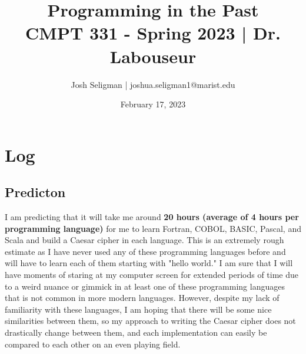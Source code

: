 \documentclass[letterpaper, 10pt, DIV=13]{scrartcl}
\title {
	\normalfont
	\huge{Programming in the Past} \\
	\vspace{10pt}
	\large{CMPT 331 - Spring 2023 | Dr. Labouseur}
}
\author{\normalfont Josh Seligman | joshua.seligman1@marist.edu}
\date{\normalfont February 17, 2023}
\numberwithin{equation}{section}
\numberwithin{figure}{section}
\numberwithin{table}{section}
\begin{document}
\maketitle

\section{Log}
\subsection{Predicton}
I am predicting that it will take me around \textbf{20 hours (average of 4 hours per programming language)} for me to learn Fortran, COBOL, BASIC, Pascal, and Scala and build a Caesar cipher in each language. This is an extremely rough estimate as I have never used any of these programming languages before and will have to learn each of them starting with "hello world." I am sure that I will have moments of staring at my computer screen for extended periods of time due to a weird nuance or gimmick in at least one of these programming languages that is not common in more modern languages. However, despite my lack of familiarity with these languages, I am hoping that there will be some nice similarities between them, so my approach to writing the Caesar cipher does not drastically change between them, and each implementation can easily be compared to each other on an even playing field.
\end{document}
